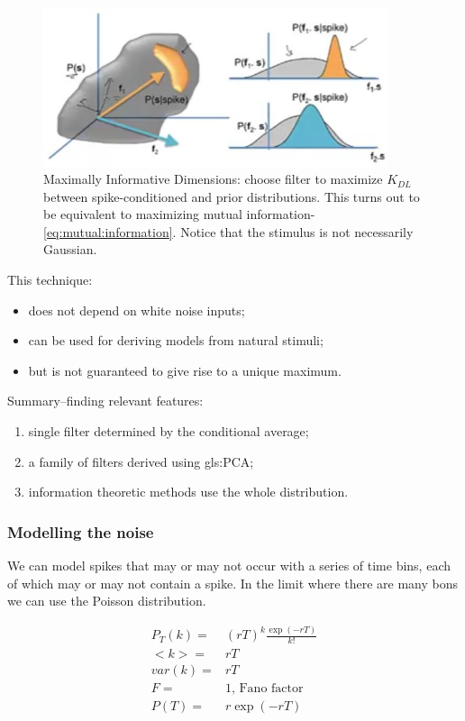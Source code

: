\documentclass[]{article}
\begin{document}
\begin{figure}[H]
	\caption[Maximally Informative Dimensions]{Maximally Informative Dimensions: choose filter to maximize $K_{DL}$ between spike-conditioned and prior distributions. This turns out to be equivalent to maximizing mutual information-\eqref{eq:mutual:information}. Notice that the stimulus is not necessarily Gaussian.}
	\includegraphics[width=0.9\textwidth]{maximally-informative-dimensions}
\end{figure}
This technique:
\begin{itemize}
	\item does not depend on white noise inputs;
	\item can be used for deriving models from natural stimuli;
	\item but is not guaranteed to give rise to a unique maximum.
\end{itemize}

Summary--finding relevant features:
\begin{enumerate}
	\item single filter determined by the conditional average;
	\item  a family of filters derived using \gls{gls:PCA};
	\item information theoretic methods use the whole distribution.
\end{enumerate}

\subsubsection{Modelling the noise}

We can model spikes that may or may not occur with a series of time bins, each of which may or may not contain a spike. In the limit where there are many bons we can use the Poisson distribution.

\begin{align*}
	P_T(k) =& (rT)^k\frac{\exp(-rT)}{k!}\\
	<k> =& rT\\
	var(k) =& rT\\
	F =& 1 \text{, Fano factor}\\
	P(T)=&r \exp(-rT)
\end{align*}
\end{document}
